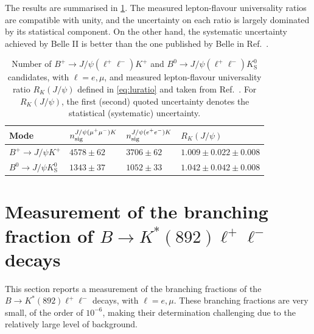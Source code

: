 \documentclass{moriond}
\def\epem{\ensuremath{e^+e^-}\xspace}
\def\mumu{\ensuremath{\mu^+\mu^-}\xspace}
\def\Bz{\ensuremath{B^0}\xspace}
\def\Bp{\ensuremath{B^+}\xspace}
\def\Kp{\ensuremath{K^+}\xspace}
\def\KS{\ensuremath{K^0_{\mathrm{S}}}\xspace}
\newcommand\Tstrut{\rule{0pt}{2.6ex}}         %
\newcommand\Bstrut{\rule[-0.9ex]{0pt}{0pt}}   %
\begin{document}
The results are summarised in \cref{tab:jpsik}.
The measured lepton-flavour universality ratios are compatible with unity, and the uncertainty on each ratio is largely dominated by its statistical component.
On the other hand, the systematic uncertainty achieved by Belle II is better than the one published by Belle in Ref.~\cite{BELLE:2019xld}.

\begin{table}[tb]
\caption{Number of $\Bp\to J/\psi(\ell^+\ell^-)\Kp$ and $\Bz\to J/\psi(\ell^+\ell^-)\KS$ candidates, with $\ell=e,\mu$, and measured lepton-flavour universality ratio $R_{K}\left(J/\psi\right)$ defined in \cref{eq:luratio} and taken from Ref.~{\protect\cite{Belle-II:2022dbo}}.
For $R_{K}\left(J/\psi\right)$, the first (second) quoted uncertainty denotes the statistical (systematic) uncertainty.}
\vspace{0.4cm}
\centering
\begin{tabular}{|llll|}
\hline
Mode & $n_{\rm sig}^{J/\psi(\mumu)K}$ & $n_{\rm sig}^{J/\psi(\epem)K}$ & $R_{K}\left(J/\psi\right)$ \Tstrut\Bstrut\\
\hline
$\Bp\to J/\psi \Kp$ & $4578\pm62$ & $3706\pm62$ & $1.009 \pm 0.022 \pm 0.008$ \Tstrut\\
$\Bz\to J/\psi \KS$ & $1343\pm37$ & $1052\pm33$ & $1.042 \pm 0.042 \pm 0.008$ \Bstrut\\
\hline
\end{tabular}
\label{tab:jpsik}
\end{table}

\section{Measurement of the branching fraction of $B \to K^{\ast}(892)\ell^+\ell^-$  decays}\label{sec:kstarll}

This section reports a measurement of the branching fractions of the $B \to K^{\ast}(892)\ell^+\ell^-$ decays, with $\ell=e,\mu$.
These branching fractions are very small, of the order of $10^{-6}$, making their determination challenging due to the relatively large level of background.

\end{document}
